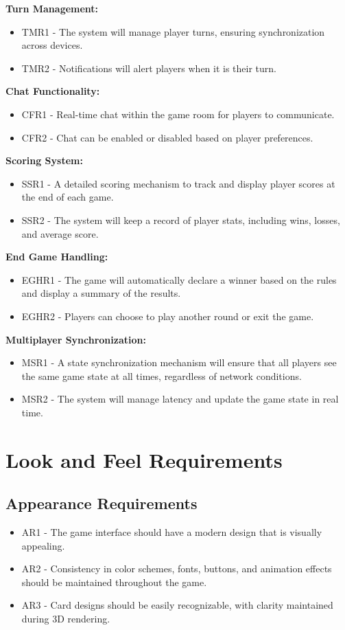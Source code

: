 \documentclass{article}
\begin{document}
\textbf{Turn Management:}
\begin{itemize}
    \item TMR1 - The system will manage player turns, ensuring synchronization across devices.
    \item TMR2 - Notifications will alert players when it is their turn.
\end{itemize}

\textbf{Chat Functionality:}
\begin{itemize}
    \item CFR1 - Real-time chat within the game room for players to communicate.
    \item CFR2 - Chat can be enabled or disabled based on player preferences.
\end{itemize}

\textbf{Scoring System:}
\begin{itemize}
    \item SSR1 - A detailed scoring mechanism to track and display player scores at the end of each game.
    \item SSR2 - The system will keep a record of player stats, including wins, losses, and average score.
\end{itemize}

\textbf{End Game Handling:}
\begin{itemize}
    \item EGHR1 - The game will automatically declare a winner based on the rules and display a summary of the results.
    \item EGHR2 - Players can choose to play another round or exit the game.
\end{itemize}

\textbf{Multiplayer Synchronization:}
\begin{itemize}
    \item MSR1 - A state synchronization mechanism will ensure that all players see the same game state at all times, regardless of network conditions.
    \item MSR2 - The system will manage latency and update the game state in real time.
\end{itemize}

\section{Look and Feel Requirements}

\subsection{Appearance Requirements}
\begin{itemize}
    \item AR1 - The game interface should have a modern design that is visually appealing.
    \item AR2 - Consistency in color schemes, fonts, buttons, and animation effects should be maintained throughout the game.
    \item AR3 - Card designs should be easily recognizable, with clarity maintained during 3D rendering.
\end{itemize}
\end{document}
